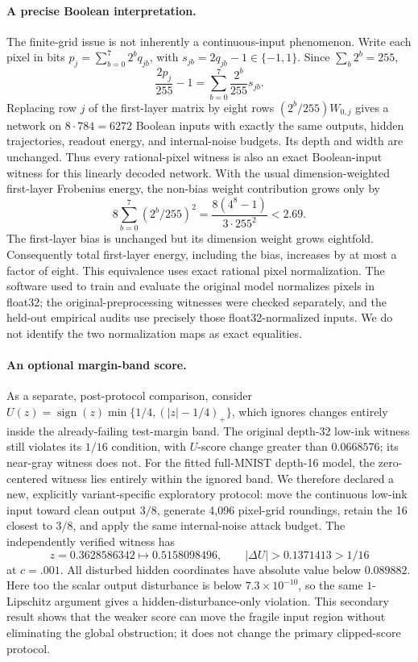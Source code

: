 \paragraph{A precise Boolean interpretation.}
The finite-grid issue is not inherently a continuous-input phenomenon.  Write each pixel in bits $p_j=\sum_{b=0}^7 2^b q_{jb}$, with $s_{jb}=2q_{jb}-1\in\{-1,1\}$.  Since $\sum_b2^b=255$,
\[
 \frac{2p_j}{255}-1=\sum_{b=0}^7\frac{2^b}{255}s_{jb}.
\]
Replacing row $j$ of the first-layer matrix by eight rows $(2^b/255)W_{0,j}$ gives a network on $8\cdot784=6272$ Boolean inputs with exactly the same outputs, hidden trajectories, readout energy, and internal-noise budgets.  Its depth and width are unchanged.  Thus every rational-pixel witness is also an exact Boolean-input witness for this linearly decoded network.  With the usual dimension-weighted first-layer Frobenius energy, the non-bias weight contribution grows only by
\[
 8\sum_{b=0}^7(2^b/255)^2
 =\frac{8(4^8-1)}{3\cdot255^2}<2.69.
\]
The first-layer bias is unchanged but its dimension weight grows eightfold.  Consequently total first-layer energy, including the bias, increases by at most a factor of eight.
This equivalence uses exact rational pixel normalization.  The software used to train and evaluate the original model normalizes pixels in float32; the original-preprocessing witnesses were checked separately, and the held-out empirical audits use precisely those float32-normalized inputs.  We do not identify the two normalization maps as exact equalities.

\paragraph{An optional margin-band score.}
As a separate, post-protocol comparison, consider
$U(z)=\operatorname{sign}(z)\min\{1/4,(|z|-1/4)_+\}$, which ignores changes entirely inside the already-failing test-margin band.  The original depth-32 low-ink witness still violates its $1/16$ condition, with $U$-score change greater than $0.0668576$; its near-gray witness does not.  For the fitted full-MNIST depth-16 model, the zero-centered witness lies entirely within the ignored band.  We therefore declared a new, explicitly variant-specific exploratory protocol: move the continuous low-ink input toward clean output $3/8$, generate 4,096 pixel-grid roundings, retain the 16 closest to $3/8$, and apply the same internal-noise attack budget.  The independently verified witness has
\[
 z=0.3628586342\longmapsto0.5158098496,
 \qquad |\Delta U|>0.1371413>1/16
\]
at $c=.001$.  All disturbed hidden coordinates have absolute value below $0.089882$.  Here too the scalar output disturbance is below $7.3\times10^{-10}$, so the same $1$-Lipschitz argument gives a hidden-disturbance-only violation.  This secondary result shows that the weaker score can move the fragile input region without eliminating the global obstruction; it does not change the primary clipped-score protocol.

